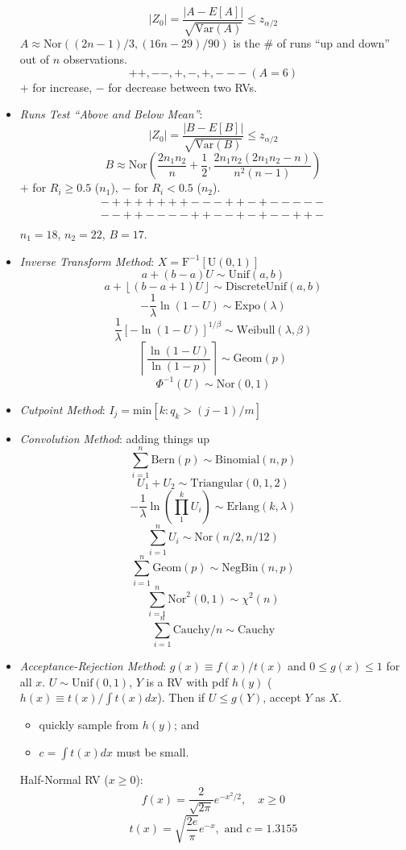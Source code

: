 \documentclass[10pt, twocolumn]{article}
\begin{document}
\begin{itemize}
\[ |Z_0| = \frac{|A-E[A]|}{\sqrt{\text{Var}(A)}} \leq z_{\alpha/2} \]
$A \approx \text{Nor}((2n-1)/3, (16n-29)/90)$ is the \# of runs ``up and down'' out of $n$ observations. 
\[ ++, --, +, -, +, ---\ (A=6) \]
$+$ for increase, $-$ for decrease between two RVs.
\item \emph{Runs Test ``Above and Below Mean''}:
\[ |Z_0| = \frac{|B-E[B]|}{\sqrt{\text{Var}(B)}} \leq z_{\alpha/2} \]
\[ B \approx \text{Nor}\left(\frac{2n_1n_2}{n}+\frac{1}{2}, \frac{2n_1n_2(2n_1n_2-n)}{n^2(n-1)}\right) \]
$+$ for $R_i \geq 0.5$ ($n_1$), $-$ for $R_i < 0.5$ ($n_2$).
\[ \begin{array}{c}
- + + + + + + + - - - + + - + - - - - - \\
- - + + - - - - + + - - + - + - - + + - \\
\end{array} \]
$n_1 = 18$, $n_2 = 22$, $B = 17$.
\item \emph{Inverse Transform Method}: $X=\text{F}^{-1}[\text{U}(0,1)]$
\[ a+(b-a)U \sim \text{Unif}(a,b) \]
\[ a+\left\lfloor(b-a+1)U\right\rfloor \sim \text{DiscreteUnif}(a,b) \]
\[ -\frac{1}{\lambda}\ln(1-U) \sim \text{Expo}(\lambda) \]
\[ \frac{1}{\lambda}[-\ln(1-U)]^{1/\beta} \sim \text{Weibull}(\lambda,\beta) \]
\[ \left\lceil\frac{\ln(1-U)}{\ln(1-p)}\right\rceil \sim \text{Geom}(p) \]
\[ \Phi^{-1}(U) \sim \text{Nor}(0,1) \]
\item \emph{Cutpoint Method}: $I_j=\text{min}[k:q_k>(j-1)/m]$
\item \emph{Convolution Method}: adding things up
\[ \sum_{i=1}^n\text{Bern}(p) \sim \text{Binomial}(n,p) \]
\[ U_1+U_2\sim\text{Triangular}(0,1,2) \]
\[ -\frac{1}{\lambda}\ln(\prod_1^k U_i) \sim \text{Erlang}(k,\lambda) \]
\[ \sum_{i=1}^nU_i \sim \text{Nor}(n/2,n/12) \]
\[ \sum_{i=1}^n\text{Geom}(p) \sim \text{NegBin}(n,p) \]
\[ \sum_{i=1}^n\text{Nor}^2(0,1) \sim \chi^2(n) \]
\[ \sum_{i=1}^n\text{Cauchy}/n \sim \text{Cauchy} \]
\item \emph{Acceptance-Rejection Method}: $g(x) \equiv f(x)/t(x)$ and $0 \leq g(x) \leq 1$ for all $x$. $U \sim \text{Unif}(0,1)$, $Y$ is a RV with pdf $h(y)$ ($h(x) \equiv t(x)/\int t(x)dx$). Then if $U \leq g(Y)$, accept $Y$ as $X$.
\begin{itemize}
  \item quickly sample from $h(y)$; and 
  \item $c=\int t(x)dx$ must be small. 
\end{itemize}
Half-Normal RV ($x \geq 0$): 
\[ f(x) = \frac{2}{\sqrt{2\pi}}e^{-x^2/2}, \quad x \geq 0 \]
\[ t(x) = \sqrt{\frac{2e}{\pi}}e^{-x}, \text{ and } c = 1.3155 \]

\end{itemize}
\end{document}
